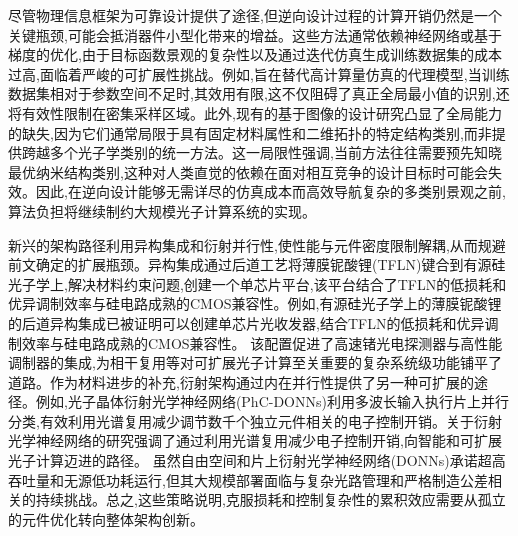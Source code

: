 \documentclass[11pt]{article}
\begin{document}
尽管物理信息框架为可靠设计提供了途径,但逆向设计过程的计算开销仍然是一个关键瓶颈,可能会抵消器件小型化带来的增益。这些方法通常依赖神经网络或基于梯度的优化,由于目标函数景观的复杂性以及通过迭代仿真生成训练数据集的成本过高,面临着严峻的可扩展性挑战。例如,旨在替代高计算量仿真的代理模型,当训练数据集相对于参数空间不足时,其效用有限,这不仅阻碍了真正全局最小值的识别,还将有效性限制在密集采样区域。此外,现有的基于图像的设计研究凸显了全局能力的缺失,因为它们通常局限于具有固定材料属性和二维拓扑的特定结构类别,而非提供跨越多个光子学类别的统一方法。这一局限性强调,当前方法往往需要预先知晓最优纳米结构类别,这种对人类直觉的依赖在面对相互竞争的设计目标时可能会失效。因此,在逆向设计能够无需详尽的仿真成本而高效导航复杂的多类别景观之前,算法负担将继续制约大规模光子计算系统的实现。\citep{doi_10_1109_cleo_europe_eqec65582_2025_11110329_26a41a7d} \citep{doi_10_1002_adom_202100548_6789fa4c}

新兴的架构路径利用异构集成和衍射并行性,使性能与元件密度限制解耦,从而规避前文确定的扩展瓶颈。异构集成通过后道工艺将薄膜铌酸锂(TFLN)键合到有源硅光子学上,解决材料约束问题,创建一个单芯片平台,该平台结合了TFLN的低损耗和优异调制效率与硅电路成熟的CMOS兼容性。例如,有源硅光子学上的薄膜铌酸锂的后道异构集成已被证明可以创建单芯片光收发器,结合TFLN的低损耗和优异调制效率与硅电路成熟的CMOS兼容性。\citep{s2_9b444e84d20ae6e3d62d2d4df30268b5a53baad2_40af2cc9} 该配置促进了高速锗光电探测器与高性能调制器的集成,为相干复用等对可扩展光子计算至关重要的复杂系统级功能铺平了道路。作为材料进步的补充,衍射架构通过内在并行性提供了另一种可扩展的途径。例如,光子晶体衍射光学神经网络(PhC-DONNs)利用多波长输入执行片上并行分类,有效利用光谱复用减少调节数千个独立元件相关的电子控制开销。关于衍射光学神经网络的研究强调了通过利用光谱复用减少电子控制开销,向智能和可扩展光子计算迈进的路径。\citep{doi_10_1002_nap2_70098_8d5f2f8a} 虽然自由空间和片上衍射光学神经网络(DONNs)承诺超高吞吐量和无源低功耗运行,但其大规模部署面临与复杂光路管理和严格制造公差相关的持续挑战。总之,这些策略说明,克服损耗和控制复杂性的累积效应需要从孤立的元件优化转向整体架构创新。\citep{s2_9b444e84d20ae6e3d62d2d4df30268b5a53baad2_40af2cc9} \citep{doi_10_1515_nanoph_2025_0168_86a0f7aa} \citep{doi_10_1002_nap2_70098_8d5f2f8a}
\end{document}

